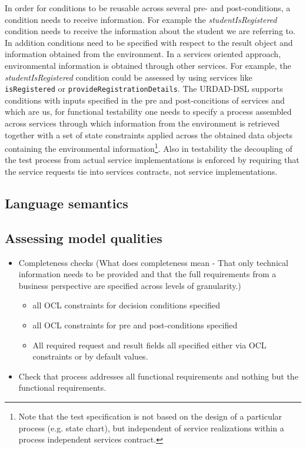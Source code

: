In order for conditions to be reusable across several pre- and post-conditions, a condition needs to receive information. For example the \emph{studentIsRegistered} condition needs to receive the information about the student we are referring to. In addition conditions need to be specified with respect to the result object and information obtained from the environment. In a services oriented approach, environmental information is obtained through other services. For example, the \emph{studentIsRegistered} condition could be assessed by using services like \verb+isRegistered+ or \verb+provideRegistrationDetails+. The URDAD-DSL supports conditions with inputs specified in the pre and post-concitions of services and which are us, for functional testability one needs to specify a process assembled across services through which information from the environment is retrieved together with a set of state constraints applied across the obtained data objects containing the environmental information\footnote{Note that the test specification is not based on the design of a particular process (e.g. state chart), but independent of service realizations within a process independent services contract.}. Also in testability the decoupling of the test process from actual service implementations is enforced by requiring that the service requests tie into services contracts, not service implementations. 
 


\subsection{Language semantics}




\subsection{Assessing model qualities}



\begin{itemize}
  \item Completeness checks
(What does completeness mean - That only technical information needs to be provided and that the full requirements
from a business perspective are specified across levels of granularity.)
    \begin{itemize}
     \item all OCL constraints for decision conditions specified
     \item all OCL constraints for pre and post-conditions specified
     \item All required request and result fields all specified either via OCL constraints 
	or by default values.
    \end{itemize}
  \item Check that process addresses all functional requirements and nothing but the functional requirements.
\end{itemize}

